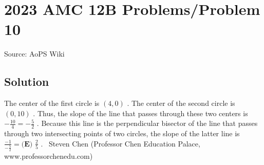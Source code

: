\documentclass[12pt]{article}
\begin{document}
\section*{{2023 AMC 12B Problems/Problem 10}}
Source: AoPS Wiki

\subsection*{Solution}
The center of the first circle is $(4,0)$ .
The center of the second circle is $(0,10)$ .
Thus, the slope of the line that passes through these two centers is $- \frac{10}{4} = - \frac{5}{2}$ . Because this line is the perpendicular bisector of the line that passes through two intersecting points of two circles, the slope of the latter line is $\frac{-1}{- \frac{5}{2}} = \boxed{\textbf{(E) } \frac{2}{5}}$ . ~Steven Chen (Professor Chen Education Palace, www.professorchenedu.com)
\end{document}
